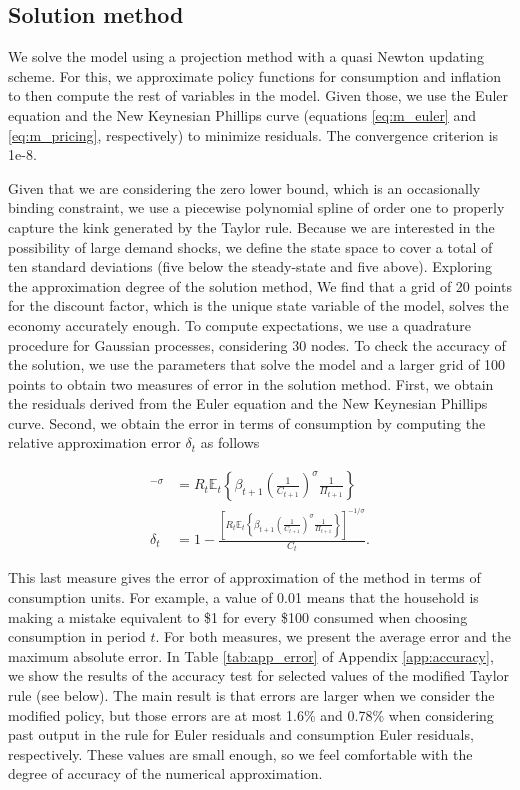 \documentclass[11pt]{article}
\numberwithin{equation}{section}
\begin{document}


\subsection{Solution method}

We solve the model using a projection method with a quasi Newton updating scheme. For this, we approximate policy functions for consumption and inflation to then compute the rest of variables in the model. Given those, we use the Euler equation and the New Keynesian Phillips curve (equations \ref{eq:m_euler} and \ref{eq:m_pricing}, respectively) to minimize residuals. The convergence criterion is 1e-8.

Given that we are considering the zero lower bound, which is an occasionally binding constraint, we use a piecewise polynomial spline of order one to properly capture the kink generated by the Taylor rule. Because we are interested in the possibility of large demand shocks, we define the state space to cover a total of ten standard deviations (five below the steady-state and five above). Exploring the approximation degree of the solution method, We find that a grid of 20 points for the discount factor, which is the unique state variable of the model, solves the economy accurately enough. To compute expectations, we use a quadrature procedure for Gaussian processes, considering 30 nodes. To check the accuracy of the solution, we use the parameters that solve the model and a larger grid of 100 points to obtain two measures of error in the solution method. First, we obtain the residuals derived from the Euler equation and the New Keynesian Phillips curve. Second, we obtain the error in terms of consumption by computing the relative approximation error $\delta_t$ as follows

\begin{align*}
	[C_t(1-\delta_t)]^{-\sigma}&=R_t\mathbb{E}_t\left\{\beta_{t+1}\left(\frac{1}{C_{t+1}}\right)^{\sigma}\frac{1}{\Pi_{t+1}}\right\}\\
	\delta_t&=1-\frac{\left[R_t\mathbb{E}_t\left\{\beta_{t+1}\left(\frac{1}{C_{t+1}}\right)^{\sigma}\frac{1}{\Pi_{t+1}}\right\}\right]^{-1/\sigma}}{C_t}.
\end{align*}

This last measure gives the error of approximation of the method in terms of consumption units. For example, a value of 0.01 means that the household is making a mistake equivalent to \$1 for every \$100 consumed when choosing consumption in period $t$. For both measures, we present the average error and the maximum absolute error. In Table \ref{tab:app_error} of Appendix \ref{app:accuracy}, we show the results of the accuracy test for selected values of the modified Taylor rule (see below). The main result is that errors are larger when we consider the modified policy, but those errors are at most 1.6\% and 0.78\% when considering past output in the rule for Euler residuals and consumption Euler residuals, respectively. These values are small enough, so we feel comfortable with the degree of accuracy of the numerical approximation.
\end{document}
